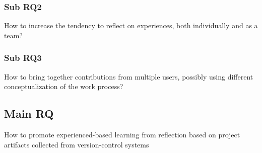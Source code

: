 \subsubsection{Sub RQ2}
\noindent\makebox[\linewidth]{\rule{\textwidth}{0.5pt}} 

\begin{center}
How to increase the tendency to reflect on experiences, both individually and as a team? \\
\end{center}  

\noindent\makebox[\linewidth]{\rule{\textwidth}{0.5pt}}

\subsubsection{Sub RQ3}
\noindent\makebox[\linewidth]{\rule{\textwidth}{0.5pt}} 

\begin{center}
How to bring together contributions from multiple users, possibly using different conceptualization of the work process? \\
\end{center}

\noindent\makebox[\linewidth]{\rule{\textwidth}{0.5pt}} 

\subsection{Main RQ}
\noindent\makebox[\linewidth]{\rule{\textwidth}{0.5pt}} 

\begin{center}
How to promote experienced-based learning from reflection based on project artifacts collected from version-control systems \\
\end{center}